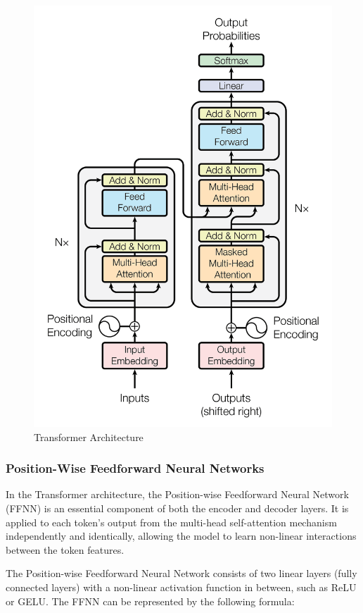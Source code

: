 \documentclass[12pt]{article}
\begin{document}
\begin{figure}[h]
    \centering
    \includegraphics[scale=0.2]{./media/transformer.png}
    \caption{Transformer Architecture}
    \label{fig:transformer}
\end{figure}

\subsubsection{Position-Wise Feedforward Neural Networks}
In the Transformer architecture, the Position-wise Feedforward Neural Network (FFNN) is an essential component of both the encoder and decoder layers. It is applied to each token's output from the multi-head self-attention mechanism independently and identically, allowing the model to learn non-linear interactions between the token features.

The Position-wise Feedforward Neural Network consists of two linear layers (fully connected layers) with a non-linear activation function in between, such as ReLU or GELU. The FFNN can be represented by the following formula:
\end{document}
